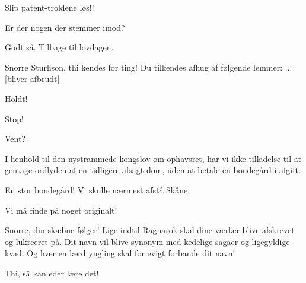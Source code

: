 \documentclass[a4paper,11pt]{article}
\begin{document}
\begin{sketch}
 Slip patent-troldene løs!!


 Er der nogen der stemmer imod?


 Godt så. Tilbage til lovdagen.

 Snorre Sturlison, thi kendes for ting! Du tilkendes afhug af
følgende lemmer: ... [bliver afbrudt]

 Holdt!

 Stop!

 Vent?

 I henhold til den nystrammede kongslov om ophavsret, har vi ikke
tilladelse til at gentage ordlyden af en tidligere afsagt dom, uden at
betale en bondegård i afgift.

 En stor bondegård! Vi skulle nærmest afstå Skåne.

 Vi må finde på noget originalt!


 Snorre, din skæbne følger! Lige indtil Ragnarok skal dine værker
blive afskrevet og lukreeret på. Dit navn vil blive synonym med
kedelige sagaer og ligegyldige kvad. Og hver en lærd yngling skal for
evigt forbande dit navn!

 Thi, så kan eder lære det!



\end{sketch}
\end{document}
